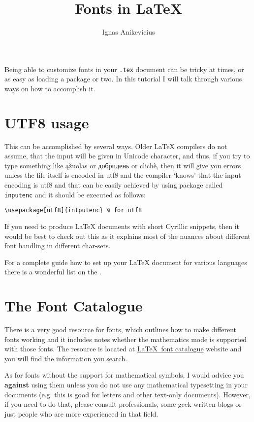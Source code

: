 \documentclass[
    draft
]{scrartcl}
\title{Fonts in \LaTeX{}}
\author{Ignas Anikevicius}
\newcommand\cyrtext[1]{{\fontencoding{T2A}\selectfont #1}}
\begin{document}
\maketitle
\tableofcontents
\listoftodos

Being able to customize fonts in your \verb|.tex| document can be tricky at
times, or as easy as loading a package or two. In this tutorial I will talk
through various ways on how to accomplish it.

\section{UTF8 usage}

This can be accomplished by several ways. Older \LaTeX{} compilers do not
assume, that the input will be given in Unicode character, and thus, if you try
to type something like 
ąžuolas or 
\cyrtext{добридень} or 
clichè, then it will give you
errors unless the file itself is encoded in utf8 and the compiler `knows' that
the input encoding is utf8 and that can be easily achieved by using package
called \verb|inputenc| and it should be executed as follows:
\begin{lstlisting}
\usepackage[utf8]{intputenc} % for utf8
\end{lstlisting}

If you need to produce \LaTeX{} documents with short Cyrillic snippets, then it
would be best to check out this
as it explains most of the nuances about different font handling in different
char-sets.

For a complete guide how to set up your \LaTeX{} document for various languages
there is a wonderful list on the
.

\section{The Font Catalogue}

There is a very good resource for fonts, which outlines how to make different
fonts working and it includes notes whether the mathematics mode is supported
with those fonts. 
%
The resource is located at \href{http://www.tug.dk/FontCatalogue/}{\LaTeX\ font
catalogue} website and you will find the information you search.

As for fonts without the support for mathematical symbols, I would advice you
\textbf{against} using them unless you do not use any mathematical  typesetting
in your documents (e.g. this is good for letters and other text-only documents).
%
However, if you need to do that, please consult professionals, some geek-written
blogs or just people who are more experienced in that field.
\end{document}
